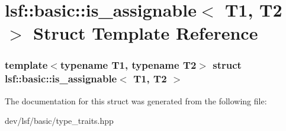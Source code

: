 \hypertarget{structlsf_1_1basic_1_1is__assignable}{
\section{lsf::basic::is\_\-assignable$<$ T1, T2 $>$ Struct Template Reference}
\label{structlsf_1_1basic_1_1is__assignable}
}
\subsubsection*{template$<$typename T1, typename T2$>$ struct lsf::basic::is\_\-assignable$<$ T1, T2 $>$}



The documentation for this struct was generated from the following file:\begin{DoxyCompactItemize}
\item 
dev/lsf/basic/type\_\-traits.hpp\end{DoxyCompactItemize}
